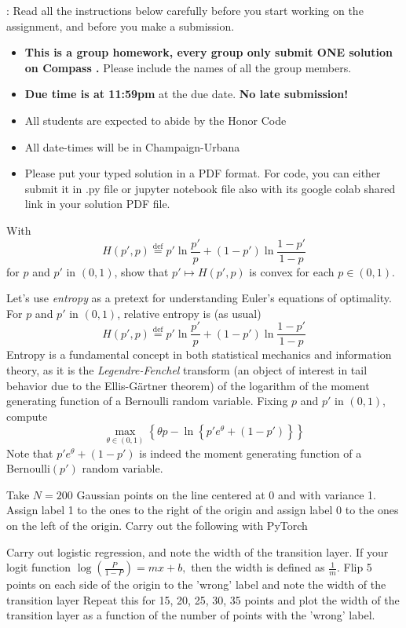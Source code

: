 \documentclass[a4 paper]{article}
\newcommand{\Def}{\overset{\text{def}}{=}}
\newcommand{\lb}{\left\{}
\newcommand{\rb}{\right\}}
\newcommand\BackgroundPic{
\put(16, 28){
\parbox[t]{\textwidth}{
\texttt{[image: logo.png]}%
}
}
}
\begin{document}
\AddToShipoutPicture*{\setlength{\unitlength}{1cm}\BackgroundPic} 
\textbf{ }: Read all the instructions below carefully before you start working on the assignment, and before you make a submission.
\begin{itemize}
        \item \textbf{This is a group homework, every group only submit ONE solution on Compass .} Please include the names of all the group members. 
    \item \textbf{Due time is at 11:59pm} at the due date. \textbf{No late submission!}
    \item All students are expected to abide by the Honor Code
    \item All date-times will be in Champaign-Urbana
    \item Please put your typed solution in a PDF format. For code, you can either submit it in .py file or jupyter notebook file also with its google colab shared link in your solution PDF file.
\end{itemize}
With
\begin{equation*} H(p',p)\Def p'\ln \frac{p'}{p}+(1-p')\ln \frac{1-p'}{1-p} \end{equation*}
for $p$ and $p'$ in $(0,1)$, show that $p'\mapsto H(p',p)$ is convex for each $p\in (0,1)$.


Let's use \emph{entropy} as a pretext for understanding Euler's equations of optimality.  For $p$ and $p'$ in $(0,1)$, relative entropy is (as usual)
\begin{equation*} H(p',p)\Def p'\ln \frac{p'}{p}+(1-p')\ln \frac{1-p'}{1-p} \end{equation*}
Entropy is a fundamental concept in both statistical mechanics and information theory, as it is the \emph{Legendre-Fenchel} transform (an object of interest in tail behavior due to the Ellis-G\"artner theorem) of the logarithm of the moment generating function of a Bernoulli random variable.  Fixing $p$ and $p'$ in $(0,1)$, compute
\begin{equation*}  \max_{\theta \in (0,1)} \lb \theta p-\ln \lb p'e^\theta+(1-p')\rb \rb \end{equation*}
Note that $p'e^\theta +(1-p')$ is indeed the moment generating function of a Bernoulli$(p')$ random variable.


Take $N=200$ Gaussian points on the line centered at 0 and with variance 1. Assign label 1 to the ones to the right of the origin and assign label 0 to the ones on the left of the origin. Carry out the following with PyTorch

Carry out logistic regression, and note the width of the transition layer. If your logit function $\log(\frac{P}{1-P})=mx+b,$ then the width is defined as $\frac{1}{m}.$
Flip 5 points on each side of the origin to the 'wrong' label and note the width of the transition layer
Repeat this for 15, 20, 25, 30, 35 points and plot the width of the transition layer as a function of the number of points with the 'wrong' label. 
\end{document}
